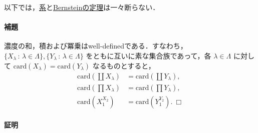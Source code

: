 \documentclass[10pt,b5paper,pandoc]{bxjsarticle}
\let\oldparagraph\paragraph
\renewcommand{\paragraph}[1]{\oldparagraph{#1}\mbox{}}
\begin{document}
以下では，\protect\hyperlink{equivalence-of-existence-of-injection-and-surjection}{系}と\protect\hyperlink{bernstein-theorem}{Bernsteinの定理}は一々断らない．

\hypertarget{ux88dcux984c}{%
\paragraph{補題}\label{ux88dcux984c}}

濃度の和，積および冪乗はwell-definedである．すなわち，\(\{ X_\lambda \,:\,\lambda \in \Lambda \}, \{ Y_\lambda \,:\,\lambda \in \Lambda \}\)
をともに互いに素な集合族であって，各 \(\lambda \in \Lambda\) に対して
\(\mathrm{card}(X_\lambda) = \mathrm{card}(Y_\lambda)\)
なるものとすると， \begin{align*}
\mathrm{card}(\coprod X_\lambda) &= \mathrm{card}(\coprod Y_\lambda),\\
\mathrm{card}(\prod X_\lambda) &= \mathrm{card}(\prod Y_\lambda),\\
\mathrm{card}(X_1^{X_2}) &= \mathrm{card}(Y_1^{Y_2}).\ \Box
\end{align*}

\hypertarget{ux8a3cux660e}{%
\paragraph{証明}\label{ux8a3cux660e}}
\end{document}
